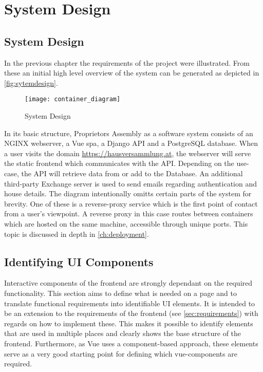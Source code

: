 \chapter[System Design]{System Design}

\section{System Design}
In the previous chapter the requirements of the project were illustrated. From these an initial high level overview of the system can be generated as depicted in \autoref{fig:sytemdesign}.


\begin{figure}[H]
    \begin{center}
    \texttt{[image: container\_diagram]}
    \end{center}
    \caption{System Design}
    \label{fig:sytemdesign}
\end{figure}

In its basic structure, Proprietors Assembly as a software system consists of an NGINX webserver, a Vue \acrlong{spa}, a Django API and a PostgreSQL database. When a user visits the domain \url{https://hausversammlung.at}, the webserver will serve the static frontend which communicates with the API. Depending on the use-case, the API will retrieve data from or add to the Database. An additional third-party Exchange server is used to send emails regarding authentication and house details. The diagram intentionally omitts certain parts of the system for brevity. One of these is a reverse-proxy service which is the first point of contact from a user's viewpoint. A reverse proxy in this case routes between containers which are hosted on the same machine, accessible through unique ports. This topic is discussed in depth in \autoref{ch:deployment}.

\section{Identifying UI Components}
Interactive components of the frontend are strongly dependant on the required functionality. This section aims to define what is needed on a page and to translate functional requirements into identifiable UI elements. It is intended to be an extension to the requirements of the frontend (see \autoref{sec:requirements}) with regards on how to implement these. This makes it possible to identify elements that are used in multiple places and clearly shows the base structure of the frontend. Furthermore, as Vue uses a component-based approach, these elements serve as a very good starting point for defining which vue-components are required.

